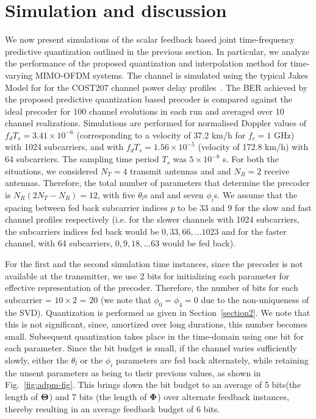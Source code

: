 \documentclass[journal,10pt,twocolumn]{IEEEtran}
\begin{document}
\section{Simulation and discussion}
\label{section3}
We now present simulations of the scalar feedback based joint
time-frequency predictive quantization outlined in the previous
section. In particular, we analyze the performance of the proposed
quantization and interpolation method for time-varying MIMO-OFDM
systems. The channel is simulated using the typical Jakes Model for
for the COST207 channel power delay
profiles~\cite{molisch2006cost259,cost1989cost}. The BER achieved by
the proposed predictive quantization based precoder is compared
against the ideal precoder for 100 channel evolutions in each run and
averaged over 10 channel realizations. Simulations are performed for
normalised Doppler values of $f_dT_s = 3.41\times 10^{-6}$ (corresponding
to a velocity of 37.2 km/h for $f_c = 1$ GHz) with 1024 subcarriers, and with
$f_dT_s = 1.56 \times 10^{-5}$ (velocity of 172.8 km/h) with 64
subcarriers. The sampling time period $T_s$ was $5\times10^{-8}$
s. For both the situations, we considered $N_T=4$ transmit antennas
and and $N_R=2$ receive antennas. Therefore, the total number of
parameters that determine the precoder is
$N_{R}(2N_{T} - N_{R}) = 12$, with five $\theta_l$s and and seven
$\phi_i$s. We assume that the spacing between fed back subcarrier
indices $p$ to be $33$ and $9$ for the slow and fast channel profiles
respectively (i.e. for the slower channels with 1024 subcarriers, the
subcarriers indices fed back would be $0, 33, 66, \ldots 1023$ and for
the faster channel, with 64 subcarriers, $0, 9, 18, \ldots 63$ would
be fed back).

For the first and the second simulation time instances, since the
precoder is not available at the transmitter, we use 2 bits for
initializing each parameter for effective representation of the
precoder. Therefore, the number of bits for each subcarrier =
$10\times 2$ = 20 (we note that $\phi_0 = \phi_4 = 0$ due to the
non-uniqueness of the SVD). Quantization is performed as given in
Section~\ref{section2}. We note that this is not significant, since,
amortized over long durations, this number becomes small. Subsequent
quantization takes place in the time-domain using one bit for each
parameter. Since the bit budget is small, if the channel varies
sufficiently slowly, either the $\theta_l$ or the $\phi_i$ parameters
are fed back alternately, while retaining the unsent parameters as
being to their previous values, as shown in
Fig.~\ref{fig:adpm-fig}.
This brings down the bit budget to an average of 5 bits(the length of $\bf{\Theta}$)
and 7 bits (the length of $\bf{\Phi}$) over alternate feedback instances,
thereby resulting in an average feedback budget of 6 bits.
\end{document}
